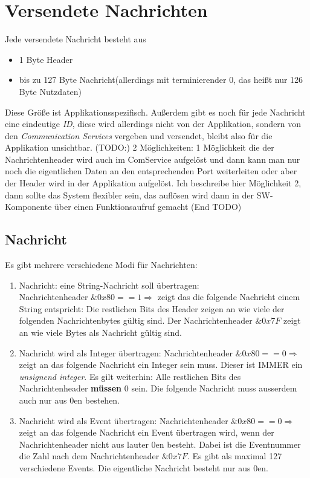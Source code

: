 \documentclass[a4paper,11pt]{scrreprt}
\begin{document}
\section{Versendete Nachrichten}
Jede versendete Nachricht besteht aus 
\begin{itemize}
\item 1 Byte Header
\item bis zu 127 Byte Nachricht(allerdings mit terminierender $0$, das heißt nur 126 Byte Nutzdaten)
\end{itemize}
Diese Größe ist Applikationsspezifisch. Außerdem gibt es noch für jede Nachricht eine eindeutige \textit{ID}, diese wird allerdings nicht von der Applikation, sondern von den \textit{Communication Services} vergeben und versendet, bleibt also für die Applikation unsichtbar.
(TODO:)
2 Möglichkeiten: 1 Möglichkeit die der Nachrichtenheader wird auch im ComService aufgelöst und dann kann man nur noch die eigentlichen Daten an den entsprechenden Port weiterleiten oder aber der Header wird in der Applikation aufgelöst. Ich beschreibe hier Möglichkeit 2, dann sollte das System flexibler sein, das auflösen wird dann in der SW-Komponente über einen Funktionsaufruf gemacht
(End TODO)
\subsection{Nachricht}
Es gibt mehrere verschiedene Modi für Nachrichten:
\begin{enumerate}[1.)]
\item Nachricht: eine String-Nachricht soll übertragen:\\
	Nachrichtenheader $\&0x80 == 1 \Rightarrow$ zeigt das die folgende Nachricht einem String entspricht: Die restlichen Bits des Header zeigen an wie viele der folgenden Nachrichtenbytes gültig sind. Der Nachrichtenheader $\&0x7F$ zeigt an wie viele Bytes als Nachricht gültig sind.
\item Nachricht wird als Integer übertragen:
	Nachrichtenheader $\&0x80 == 0 \Rightarrow$ zeigt an das folgende Nachricht ein Integer sein muss. Dieser ist IMMER ein \textit{unsignend integer}. Es gilt weiterhin: Alle restlichen Bits des Nachrichtenheader \textbf{müssen} $0$ sein. Die folgende Nachricht muss ausserdem auch nur aus $0$en bestehen.
\item Nachricht wird als Event übertragen:
	Nachrichtenheader $\&0x80 == 0 \Rightarrow$ zeigt an das folgende Nachricht ein Event übertragen wird, wenn der Nachrichtenheader nicht aus lauter $0$en besteht. Dabei ist die Eventnummer die Zahl nach dem Nachrichtenheader $\&0x7F$. Es gibt als maximal 127 verschiedene Events. Die eigentliche Nachricht besteht nur aus $0$en.
\end{enumerate}
\end{document}
